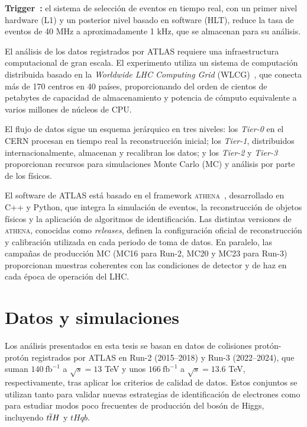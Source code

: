 \textbf{Trigger~\cite{trigger_run2}:} el sistema de selección de eventos en tiempo real, con un primer nivel hardware (L1) y un posterior nivel basado en software (HLT), reduce la tasa de eventos de 40 MHz a aproximadamente 1 kHz, que se almacenan para su análisis.

El análisis de los datos registrados por ATLAS requiere una infraestructura computacional de gran escala. El experimento utiliza un sistema de computación distribuida basado en la \textit{Worldwide LHC Computing Grid} (WLCG)~\cite{Bird:1695401}, que conecta más de 170 centros en 40 países, proporcionando del orden de cientos de petabytes de capacidad de almacenamiento y potencia de cómputo equivalente a varios millones de núcleos de CPU.  

El flujo de datos sigue un esquema jerárquico en tres niveles: los \textit{Tier-0} en el CERN procesan en tiempo real la reconstrucción inicial; los \textit{Tier-1}, distribuidos internacionalmente, almacenan y recalibran los datos; y los \textit{Tier-2} y \textit{Tier-3} proporcionan recursos para simulaciones Monte Carlo (MC) y análisis por parte de los físicos.  

El software de ATLAS está basado en el framework \textsc{athena}~\cite{athena}, desarrollado en C++ y Python, que integra la simulación de eventos, la reconstrucción de objetos físicos y la aplicación de algoritmos de identificación. Las distintas versiones de \textsc{athena}, conocidas como \textit{releases}, definen la configuración oficial de reconstrucción y calibración utilizada en cada periodo de toma de datos. En paralelo, las campañas de producción MC (MC16 para Run-2, MC20 y MC23 para Run-3) proporcionan muestras coherentes con las condiciones de detector y de haz en cada época de operación del LHC.  

\section*{Datos y simulaciones}

Los análisis presentados en esta tesis se basan en datos de colisiones protón-protón registrados por ATLAS en Run-2 (2015–2018) y Run-3 (2022–2024), que suman $140~\text{fb}^{-1}$ a $\sqrt{s}=13$ TeV y unos $166~\text{fb}^{-1}$ a $\sqrt{s}=13.6$ TeV, respectivamente, tras aplicar los criterios de calidad de datos. Estos conjuntos se utilizan tanto para validar nuevas estrategias de identificación de electrones como para estudiar modos poco frecuentes de producción del bosón de Higgs, incluyendo \(t\overline{t}H\) y \(tHqb\).  

